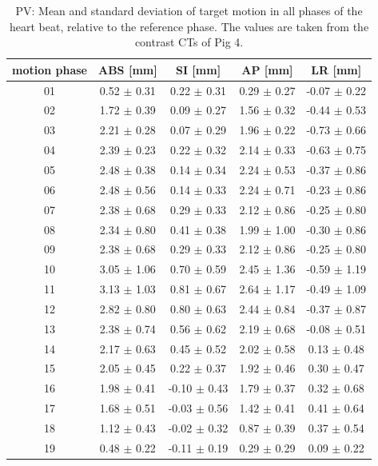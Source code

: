 \documentclass[type=dr, dr=rernat, accentcolor=tud7b,colorbacktitle, bigchapter, openright, twoside, 12pt ]{tudthesis}
\begin{document}
\begin{table}[htbp]
  \centering
    \tiny
  \caption{PV: Mean and standard deviation of target motion in all phases of the heart beat, relative to the reference phase. The values are 
  taken from the contrast CTs of Pig 4.}
  \begin{tabular}{|c|c|c|c|c|}
    \hline\hline
    motion phase\rule{0pt}{2.6ex}\rule[-1.2ex]{0pt}{0pt} & ABS [mm] & SI [mm] & AP [mm] & LR [mm]\\
    \hline
01 &0.52 $\pm$ 0.31 &0.22 $\pm$ 0.31 &0.29 $\pm$ 0.27 &-0.07 $\pm$ 0.22 \\
02 &1.72 $\pm$ 0.39 &0.09 $\pm$ 0.27 &1.56 $\pm$ 0.32 &-0.44 $\pm$ 0.53 \\
03 &2.21 $\pm$ 0.28 &0.07 $\pm$ 0.29 &1.96 $\pm$ 0.22 &-0.73 $\pm$ 0.66 \\
04 &2.39 $\pm$ 0.23 &0.22 $\pm$ 0.32 &2.14 $\pm$ 0.33 &-0.63 $\pm$ 0.75 \\
05 &2.48 $\pm$ 0.38 &0.14 $\pm$ 0.34 &2.24 $\pm$ 0.53 &-0.37 $\pm$ 0.86 \\
06 &2.48 $\pm$ 0.56 &0.14 $\pm$ 0.33 &2.24 $\pm$ 0.71 &-0.23 $\pm$ 0.86 \\
07 &2.38 $\pm$ 0.68 &0.29 $\pm$ 0.33 &2.12 $\pm$ 0.86 &-0.25 $\pm$ 0.80 \\
08 &2.34 $\pm$ 0.80 &0.41 $\pm$ 0.38 &1.99 $\pm$ 1.00 &-0.30 $\pm$ 0.86 \\
09 &2.38 $\pm$ 0.68 &0.29 $\pm$ 0.33 &2.12 $\pm$ 0.86 &-0.25 $\pm$ 0.80 \\
10 &3.05 $\pm$ 1.06 &0.70 $\pm$ 0.59 &2.45 $\pm$ 1.36 &-0.59 $\pm$ 1.19 \\
11 &3.13 $\pm$ 1.03 &0.81 $\pm$ 0.67 &2.64 $\pm$ 1.17 &-0.49 $\pm$ 1.09 \\
12 &2.82 $\pm$ 0.80 &0.80 $\pm$ 0.63 &2.44 $\pm$ 0.84 &-0.37 $\pm$ 0.87 \\
13 &2.38 $\pm$ 0.74 &0.56 $\pm$ 0.62 &2.19 $\pm$ 0.68 &-0.08 $\pm$ 0.51 \\
14 &2.17 $\pm$ 0.63 &0.45 $\pm$ 0.52 &2.02 $\pm$ 0.58 &0.13 $\pm$ 0.48 \\
15 &2.05 $\pm$ 0.45 &0.22 $\pm$ 0.37 &1.92 $\pm$ 0.46 &0.30 $\pm$ 0.47 \\
16 &1.98 $\pm$ 0.41 &-0.10 $\pm$ 0.43 &1.79 $\pm$ 0.37 &0.32 $\pm$ 0.68 \\
17 &1.68 $\pm$ 0.51 &-0.03 $\pm$ 0.56 &1.42 $\pm$ 0.41 &0.41 $\pm$ 0.64 \\
18 &1.12 $\pm$ 0.43 &-0.02 $\pm$ 0.32 &0.87 $\pm$ 0.39 &0.37 $\pm$ 0.54 \\
19 &0.48 $\pm$ 0.22 &-0.11 $\pm$ 0.19 &0.29 $\pm$ 0.29 &0.09 $\pm$ 0.22 \\
    \hline\hline
  \end{tabular}
  \label{tab:motion:PV:Pig4}
\end{table}
\end{document}
